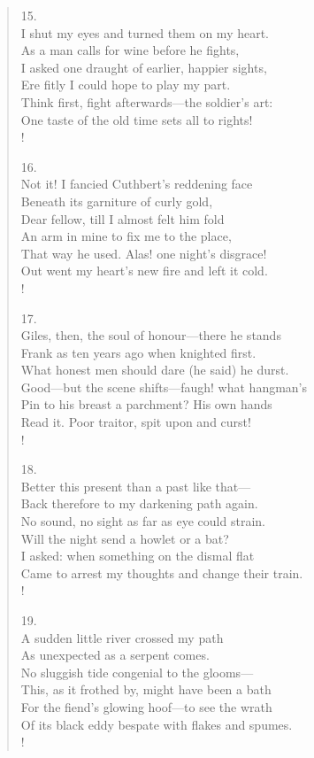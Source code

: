 \documentclass[10pt]{memoir}
\begin{document}
\begin{verse}
15.\\
I shut my eyes and turned them on my heart.\\
\vin As a man calls for wine before he fights,\\
\vin I asked one draught of earlier, happier sights,\\
Ere fitly I could hope to play my part.\\
Think first, fight afterwards---the soldier's art:\\
\vin One taste of the old time sets all to rights!\\!

16.\\
Not it! I fancied Cuthbert's reddening face\\
\vin Beneath its garniture of curly gold,\\
\vin Dear fellow, till I almost felt him fold\\
An arm in mine to fix me to the place,\\
That way he used. Alas! one night's disgrace!\\
\vin Out went my heart's new fire and left it cold.\\!

17.\\
Giles, then, the soul of honour---there he stands\\
\vin Frank as ten years ago when knighted first.\\
\vin What honest men should dare (he said) he durst.\\
Good---but the scene shifts---faugh! what hangman's\\
Pin to his breast a parchment? His own hands\\
\vin Read it. Poor traitor, spit upon and curst!\\!

18.\\
Better this present than a past like that---\\
\vin Back therefore to my darkening path again.\\
\vin No sound, no sight as far as eye could strain.\\
Will the night send a howlet or a bat?\\
I asked: when something on the dismal flat\\
\vin Came to arrest my thoughts and change their train.\\!

19.\\
A sudden little river crossed my path\\
\vin As unexpected as a serpent comes.\\
\vin No sluggish tide congenial to the glooms---\\
This, as it frothed by, might have been a bath\\
For the fiend's glowing hoof---to see the wrath\\
\vin Of its black eddy bespate with flakes and spumes.\\!


\end{verse}
\end{document}
